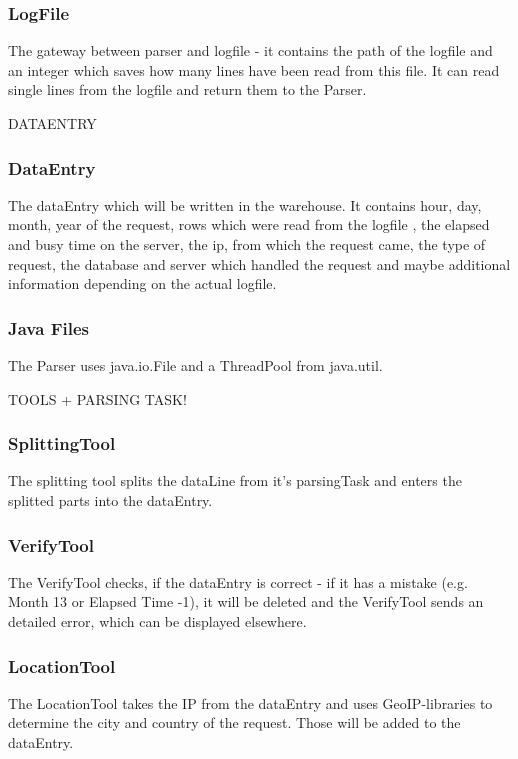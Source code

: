 \subsubsection*{LogFile}
The gateway between parser and logfile - it contains the path of the logfile and an integer 
which saves how many lines have been read from this file. It can read single lines from the logfile and return them to 
the Parser.

DATAENTRY

\subsubsection*{DataEntry}
The dataEntry which will be written in the warehouse. It contains hour, day, month, year of the request, rows which were read 
from the logfile%
, the elapsed and busy time on the server, the ip, from which the request came, the type of request, the database
and server which handled the request and maybe additional information depending on the actual logfile.

\subsubsection*{Java Files}
The Parser uses java.io.File and a ThreadPool from java.util.

TOOLS + PARSING TASK!

\subsubsection*{SplittingTool}
The splitting tool splits the dataLine from it's parsingTask and enters the splitted parts into the dataEntry.

\subsubsection*{VerifyTool}
The VerifyTool checks, if the dataEntry is correct - if it has a mistake (e.g. Month 13 or Elapsed Time -1), it will 
be deleted and the VerifyTool sends an detailed error, which can be displayed elsewhere.

\subsubsection*{LocationTool}
The LocationTool takes the IP from the dataEntry and uses GeoIP-libraries to determine the city and country of the request.
Those will be added to the dataEntry.

